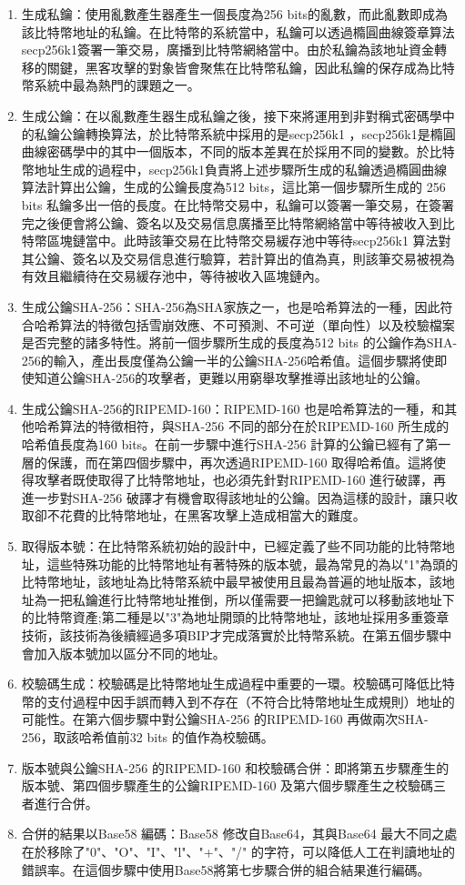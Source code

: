 			\begin{enumerate}
				\item 生成私鑰：使用亂數產生器產生一個長度為256 bits的亂數，而此亂數即成為該比特幣地址的私鑰。在比特幣的系統當中，私鑰可以透過橢圓曲線簽章算法secp256k1簽署一筆交易，廣播到⽐特幣網絡當中。由於私鑰為該地址資金轉移的關鍵，黑客攻擊的對象皆會聚焦在比特幣私鑰，因此私鑰的保存成為比特幣系統中最為熱門的課題之一。
				\item 生成公鑰：在以亂數產生器生成私鑰之後，接下來將運用到非對稱式密碼學中的私鑰公鑰轉換算法，於比特幣系統中採用的是secp256k1
				，secp256k1是橢圓曲線密碼學中的其中一個版本，不同的版本差異在於採用不同的變數。於比特幣地址生成的過程中，secp256k1負責將上述步驟所生成的私鑰透過橢圓曲線算法計算出公鑰，生成的公鑰長度為512 bits，這比第一個步驟所生成的 256 bits 私鑰多出⼀倍的⾧度。在比特幣交易中，私鑰可以簽署一筆交易，在簽署完之後便會將公鑰、簽名以及交易信息廣播至比特幣網絡當中等待被收入到比特幣區塊鏈當中。此時該筆交易在⽐特幣交易緩存池中等待secp256k1 算法對其公鑰、簽名以及交易信息進⾏驗算，若計算出的值為真，則該筆交易被視為有效且繼續待在交易緩存池中，等待被收⼊區塊鏈內。
				\item 生成公鑰SHA-256：SHA-256為SHA家族之一，也是哈希算法的一種，因此符合哈希算法的特徵包括雪崩效應、不可預測、不可逆（單向性）以及校驗檔案是否完整的諸多特性。將前一個步驟所⽣成的⾧度為512 bits 的公鑰作為SHA-256的輸入，產出長度僅為公鑰一半的公鑰SHA-256哈希值。這個步驟將使即使知道公鑰SHA-256的攻擊者，更難以⽤窮舉攻擊推導出該地址的公鑰。
				\item 生成公鑰SHA-256的RIPEMD-160：RIPEMD-160 也是哈希算法的⼀種，和其他哈希算法的特徵相符，與SHA-256 不同的部分在於RIPEMD-160 所⽣成的哈希值⾧度為160 bits。在前一步驟中進⾏SHA-256 計算的公鑰已經有了第⼀層的保護，⽽在第四個步驟中，再次透過RIPEMD-160 取得哈希值。這將使得攻擊者既使取得了⽐特幣地址，也必須先針對RIPEMD-160 進⾏破譯，再進⼀步對SHA-256 破譯才有機會取得該地址的公鑰。因為這樣的設計，讓只收取卻不花費的⽐特幣地址，在⿊客攻擊上造成相當⼤的難度。
				\item 取得版本號：在比特幣系統初始的設計中，已經定義了些不同功能的比特幣地址，這些特殊功能的比特幣地址有著特殊的版本號，最為常見的為以"1"為頭的比特幣地址，該地址為比特幣系統中最早被使用且最為普遍的地址版本，該地址為一把私鑰進行比特幣地址推倒，所以僅需要一把鑰匙就可以移動該地址下的比特幣資產;第二種是以"3"為地址開頭的比特幣地址，該地址採用多重簽章技術，該技術為後續經過多項BIP才完成落實於比特幣系統。在第五個步驟中會加入版本號加以區分不同的地址。
				\item 校驗碼生成：校驗碼是⽐特幣地址⽣成過程中重要的⼀環。校驗碼可降低⽐特幣的⽀付過程中因⼿誤而轉⼊到不存在（不符合⽐特幣地址⽣成規則）地址的可能性。在第六個步驟中對公鑰SHA-256 的RIPEMD-160 再做兩次SHA-256，取該哈希值前32 bits 的值作為校驗碼。
				\item 版本號與公鑰SHA-256 的RIPEMD-160 和校驗碼合併：即將第五步驟產⽣的版本號、第四個步驟產⽣的公鑰RIPEMD-160 及第六個步驟產⽣之校驗碼三者進行合併。
				\item 合併的結果以Base58 編碼：Base58 修改⾃Base64，其與Base64 最⼤不同之處在於移除了"0"、"O"、"I"、"l"、"+"、"/" 的字符，可以降低⼈⼯在判讀地址的錯誤率。在這個步驟中使⽤Base58將第七步驟合併的組合結果進⾏編碼。
			\end{enumerate}

